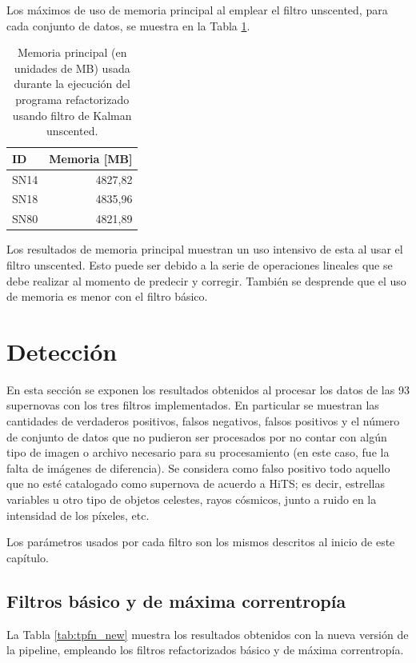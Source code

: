 Los m\'aximos de uso de memoria principal al emplear el filtro unscented, para cada conjunto de datos, se muestra en la Tabla \ref{tab:mem5}.

\begin{table}[h!]
\centering
\caption{Memoria principal (en unidades de MB) usada durante la ejecuci\'on del programa refactorizado usando filtro de Kalman unscented.}
\begin{tabular}{|l|r|}
\hline
\textbf{ID} & Memoria [MB]\\\hline\hline
SN14 & 4827,82\\\hline
SN18 & 4835,96\\\hline
SN80 & 4821,89\\\hline
\end{tabular}
\label{tab:mem5}
\end{table}

Los resultados de memoria principal muestran un uso intensivo de esta al usar el filtro unscented. Esto puede ser debido a la serie de operaciones lineales que se debe realizar al momento de predecir y corregir. Tambi\'en se desprende que el uso de memoria es menor con el filtro b\'asico.
\bigskip
 
\section{Detecci\'on}
En esta secci\'on se exponen los resultados obtenidos al procesar los datos de las 93 supernovas con los tres filtros implementados. En particular se muestran las cantidades de verdaderos positivos, falsos negativos, falsos positivos y el n\'umero de conjunto de datos que no pudieron ser procesados por no contar con alg\'un tipo de imagen o archivo necesario para su procesamiento (en este caso, fue la falta de im\'agenes de diferencia). Se considera como falso positivo todo aquello que no est\'e catalogado como supernova de acuerdo a HiTS; es decir, estrellas variables u otro tipo de objetos celestes, rayos c\'osmicos, junto a ruido en la intensidad de los p\'ixeles, etc.
\bigskip

Los par\'ametros usados por cada filtro son los mismos descritos al inicio de este cap\'itulo.

\subsection{Filtros b\'asico y de m\'axima correntrop\'ia}
La Tabla \ref{tab:tpfn_new} muestra los resultados obtenidos con la nueva versi\'on de la pipeline, empleando los filtros refactorizados b\'asico y de m\'axima correntrop\'ia.
\bigskip

